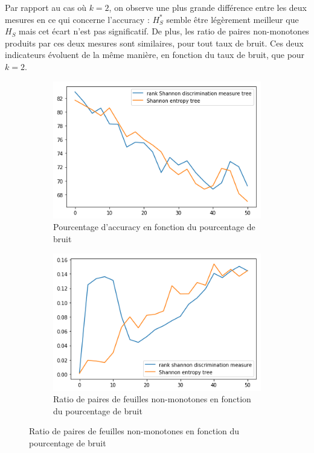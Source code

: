 \documentclass[a4paper]{article}
\begin{document}
Par rapport au cas où $k=2$, on observe une plus grande différence entre les
deux mesures en ce qui concerne l'accuracy : $H^*_S$ semble être légèrement
meilleur que $H_S$ mais cet écart n'est pas significatif. De plus, les ratio de
paires non-monotones produits par ces deux mesures sont similaires, pour tout
taux de bruit. Ces deux indicateurs évoluent de la même manière, en fonction du
taux de bruit, que pour $k=2$.

\begin{figure}[H]
    \centering
    \begin{subfigure}[c]{0.46\textwidth}
        \centering
        \includegraphics[width=\textwidth]{images/cci_5.png}
        \caption{Pourcentage d'accuracy en fonction du pourcentage de bruit}
    \end{subfigure}
    \begin{subfigure}[c]{0.46\textwidth}
        \centering
        \includegraphics[width=\textwidth]{images/ratio_5.png}
        \caption{Ratio de paires de feuilles non-monotones en fonction du pourcentage de bruit}
    \end{subfigure}
    

\end{figure}
\end{document}
